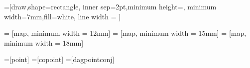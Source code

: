 



 =[draw,shape=rectangle, inner sep=2pt,minimum height=\mapminh, minimum width=7mm,fill=white, line width = \maplw]

 = [map, minimum width = 12mm] 
 = [map, minimum width = 15mm] 
 = [map, minimum width = 18mm] 


 =[point]
 =[copoint]
=[dagpointconj] %









\makeatletter
\newcommand{\boxshape}[3]{%
\pgfdeclareshape{#1}{
\inheritsavedanchors[from=rectangle] %
\inheritanchorborder[from=rectangle]
\inheritanchor[from=rectangle]{center}
\inheritanchor[from=rectangle]{north}
\inheritanchor[from=rectangle]{south}
\inheritanchor[from=rectangle]{west}
\inheritanchor[from=rectangle]{east}
\backgroundpath{%
\southwest \pgf@xa=\pgf@x \pgf@ya=\pgf@y
\northeast \pgf@xb=\pgf@x \pgf@yb=\pgf@y

\@tempdima=#2
\@tempdimb=#3

\pgfpathmoveto{\pgfpoint{\pgf@xa - 5pt + \@tempdima}{\pgf@ya}}
\pgfpathlineto{\pgfpoint{\pgf@xa - 5pt - \@tempdima}{\pgf@yb}}
\pgfpathlineto{\pgfpoint{\pgf@xb + 5pt + \@tempdimb}{\pgf@yb}}
\pgfpathlineto{\pgfpoint{\pgf@xb + 5pt - \@tempdimb}{\pgf@ya}}
\pgfpathlineto{\pgfpoint{\pgf@xa - 5pt + \@tempdima}{\pgf@ya}}
\pgfpathclose
}
}}

